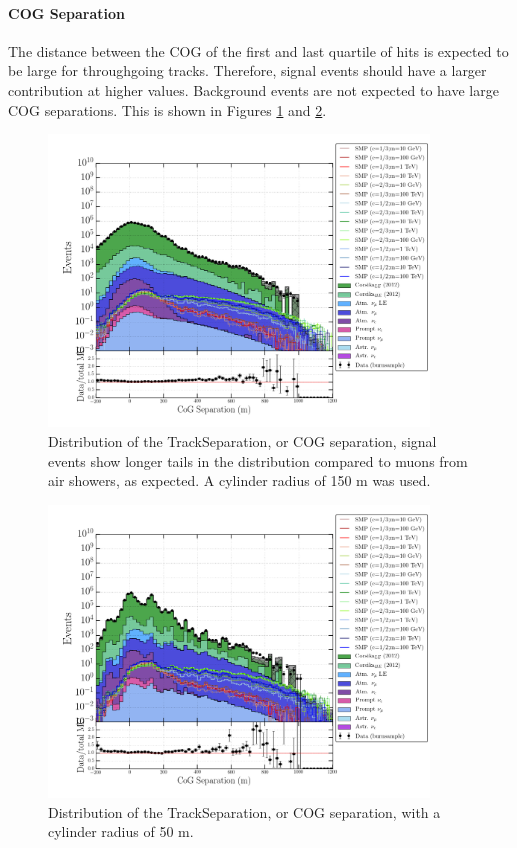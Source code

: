 \paragraph{COG Separation}
The distance between the COG of the first and last quartile of hits is expected to be large for throughgoing tracks. Therefore, signal events should have a larger contribution at higher values. Background events are not expected to have large COG separations. This is shown in Figures \ref{fig:commonvariablestracksep150} and \ref{fig:commonvariablestracksep50}.

\begin{figure}
\centering
\includegraphics[width = 0.9\textwidth]{chapter8/img/1D_stack_trackseparation_150.png}
\caption{Distribution of the TrackSeparation, or COG separation, signal events show longer tails in the distribution compared to muons from air showers, as expected. A cylinder radius of 150 m was used.}
\label{fig:commonvariablestracksep150}
\end{figure}

\begin{figure}
\centering
\includegraphics[width = 0.9\textwidth]{chapter8/img/1D_stack_trackseparation_50.png}
\caption{Distribution of the TrackSeparation, or COG separation, with a cylinder radius of 50 m.}
\label{fig:commonvariablestracksep50}
\end{figure}

